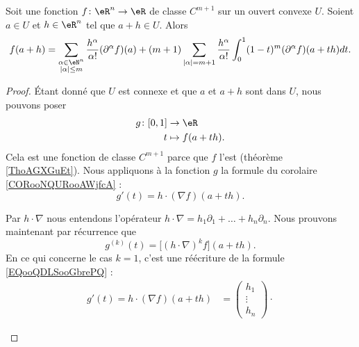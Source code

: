 \begin{theorem}		\label{THOooFKZZooAgecfp}
	Soit une fonction \(f \colon \eR^n\to \eR  \) de classe \( C^{m+1}\) sur un ouvert convexe \( U\). Soient \( a\in U\) et \( h\in \eR^n\) tel que \( a+h\in U\). Alors
	\begin{equation}
		f(a+h)=\sum_{\substack{ \alpha\in \eN^n \\ | \alpha |\leq m }  }\frac{ h^{\alpha} }{ \alpha! }(\partial^{\alpha}f)(a)+(m+1)\sum_{| \alpha |=m+1}\frac{ h^{\alpha} }{ \alpha! }\int_0^1(1-t)^m(\partial^{\alpha}f)(a+th)dt.
	\end{equation}
\end{theorem}


\begin{proof}
	Étant donné que \( U\) est connexe et que \( a\) et \( a+h\) sont dans \( U\), nous pouvons poser
	\begin{equation}
		\begin{aligned}
			g\colon \mathopen[ 0,1\mathclose] & \to \eR          \\
			t                                 & \mapsto f(a+th).
		\end{aligned}
	\end{equation}
	Cela est une fonction de classe \( C^{m+1}\) parce que \( f\) l'est (théorème \ref{ThoAGXGuEt}). Nous appliquons à la fonction \( g\) la formule du corolaire \ref{CORooNQURooAWjfcA} :
	\begin{equation}		\label{EQooQDLSooGbrePQ}
		g'(t)=h\cdot(\nabla f)(a+th).
	\end{equation}
	\begin{subproof}
		Par \( h\cdot\nabla\) nous entendons l'opérateur \( h\cdot\nabla=h_1\partial_1+\ldots+h_n\partial_n\). Nous prouvons maintenant par récurrence que
		\begin{equation}
			g^{(k)}(t)=\big[  (h\cdot \nabla)^kf  \big](a+th).
		\end{equation}
		En ce qui concerne le cas \( k=1\), c'est une réécriture de la formule \eqref{EQooQDLSooGbrePQ} :
		\begin{subequations}
			\begin{align}
				g'(t)=h\cdot(\nabla f)(a+th) & =
				\begin{pmatrix}
					h_1    \\
					\vdots \\
					h_n
				\end{pmatrix}\cdot

\end{align}
\end{subequations}
\end{subproof}
\end{proof}

